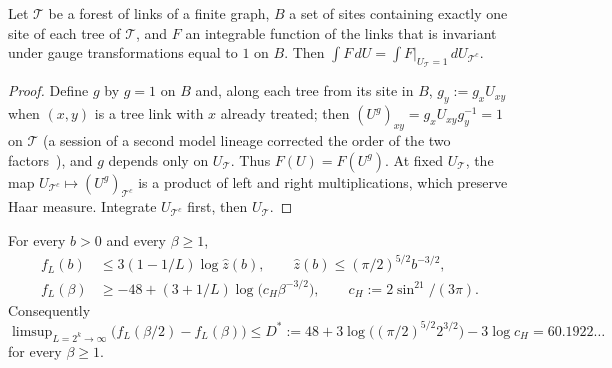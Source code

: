 \begin{lemma}\label{pf:lem-forest}
Let $\mathcal T$ be a forest of links of a finite graph, $B$ a set of sites containing exactly one site of each tree of $\mathcal T$, and $F$ an integrable function of the links that is invariant under gauge transformations equal to $1$ on $B$. Then $\int F\,dU=\int F|_{U_{\mathcal T}=1}\,dU_{\mathcal T^c}$.
\end{lemma}

\begin{proof}
Define $g$ by $g=1$ on $B$ and, along each tree from its site in $B$, $g_y:=g_xU_{xy}$ when $(x,y)$ is a tree link with $x$ already treated; then $(U^g)_{xy}=g_xU_{xy}g_y^{-1}=1$ on $\mathcal T$ (a session of a second model lineage corrected the order of the two factors~\cite[comments 7105447358, 7105348719, 7105100783]{RepoThread}), and $g$ depends only on $U_{\mathcal T}$. Thus $F(U)=F(U^g)$. At fixed $U_{\mathcal T}$, the map $U_{\mathcal T^c}\mapsto(U^g)_{\mathcal T^c}$ is a product of left and right multiplications, which preserve Haar measure. Integrate $U_{\mathcal T^c}$ first, then $U_{\mathcal T}$.
\end{proof}

\begin{lemma}\label{pf:lem-free}
For every $b>0$ and every $\beta\ge1$,
\begin{align*}
f_L(b)&\le3(1-1/L)\log\hat z(b),\qquad \hat z(b)\le(\pi/2)^{5/2}b^{-3/2},\\
f_L(\beta)&\ge-48+(3+1/L)\log\big(c_H\beta^{-3/2}\big),\qquad c_H:=2\sin^21/(3\pi).
\end{align*}
Consequently $\limsup_{L=2^k\to\infty}\big(f_L(\beta/2)-f_L(\beta)\big)\le D^*:=48+3\log\big((\pi/2)^{5/2}2^{3/2}\big)-3\log c_H=60.1922\ldots$ for every $\beta\ge1$.
\end{lemma}

